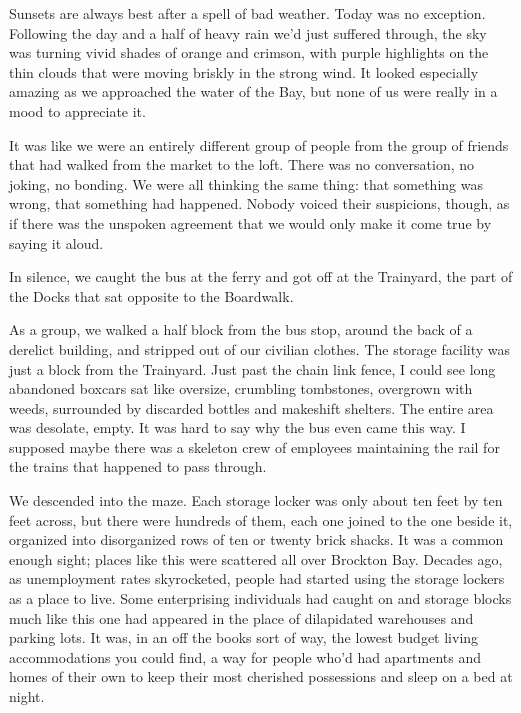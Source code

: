 





Sunsets are always best after a spell of bad weather.  Today was no exception.  Following the day and a half of heavy rain we'd just suffered through, the sky was turning vivid shades of orange and crimson, with purple highlights on the thin clouds that were moving briskly in the strong wind.  It looked especially amazing as we approached the water of the Bay, but none of us were really in a mood to appreciate it.



It was like we were an entirely different group of people from the group of friends that had walked from the market to the loft.  There was no conversation, no joking, no bonding.  We were all thinking the same thing: that something was wrong, that something had happened.  Nobody voiced their suspicions, though, as if there was the unspoken agreement that we would only make it come true by saying it aloud.



In silence, we caught the bus at the ferry and got off at the Trainyard, the part of the Docks that sat opposite to the Boardwalk.



As a group, we walked a half block from the bus stop, around the back of a derelict building, and stripped out of our civilian clothes.  The storage facility was just a block from the Trainyard.  Just past the chain link fence,  I could see long abandoned boxcars sat like oversize, crumbling tombstones, overgrown with weeds, surrounded by discarded bottles and makeshift shelters.  The entire area was desolate, empty.  It was hard to say why the bus even came this way.  I supposed maybe there was a skeleton crew of employees maintaining the rail for the trains that happened to pass through.



We descended into the maze.  Each storage locker was only about ten feet by ten feet across, but there were hundreds of them, each one joined to the one beside it, organized into disorganized rows of ten or twenty brick shacks.  It was a common enough sight; places like this were scattered all over Brockton Bay.  Decades ago, as unemployment rates skyrocketed, people had started using the storage lockers as a place to live.  Some enterprising individuals had caught on and storage blocks much like this one had appeared in the place of dilapidated warehouses and parking lots.  It was, in an off the books sort of way, the lowest budget living accommodations you could find, a way for people who'd had apartments and homes of their own to keep their most cherished possessions and sleep on a bed at night.



